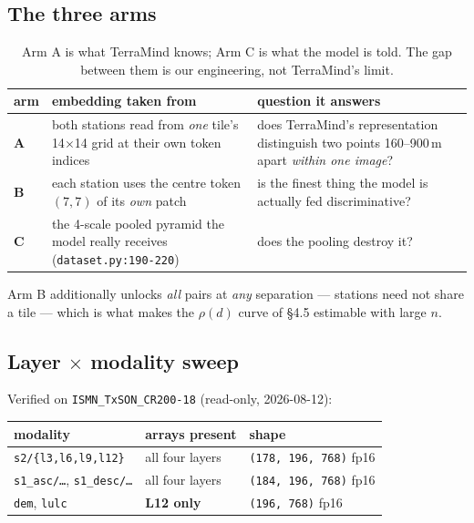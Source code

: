\documentclass[11pt,a4paper]{article}
\begin{document}
\subsection{The three arms}

\begin{table}[h]
\centering\small
\begin{tabular}{@{}p{12mm}p{58mm}p{72mm}@{}}
\toprule
arm & embedding taken from & question it answers \\
\midrule
\textbf{A} & both stations read from \emph{one} tile's 14$\times$14 grid at their own token
             indices
           & does TerraMind's representation distinguish two points 160--900\,m apart
             \emph{within one image}? \\[1mm]
\textbf{B} & each station uses the centre token $(7,7)$ of its \emph{own} patch
           & is the finest thing the model is actually fed discriminative? \\[1mm]
\textbf{C} & the 4-scale pooled pyramid the model really receives
             (\texttt{dataset.py:190-220})
           & does the pooling destroy it? \\
\bottomrule
\end{tabular}
\caption{Arm A is what TerraMind knows; Arm C is what the model is told. The gap between
them is our engineering, not TerraMind's limit.}
\end{table}

Arm B additionally unlocks \emph{all} pairs at \emph{any} separation --- stations need not
share a tile --- which is what makes the $\rho(d)$ curve of \S4.5 estimable with large $n$.

\subsection{Layer $\times$ modality sweep}

Verified on \verb|ISMN_TxSON_CR200-18| (read-only, 2026-08-12):

\begin{table}[h]
\centering\small
\begin{tabular}{@{}lll@{}}
\toprule
modality & arrays present & shape \\
\midrule
\verb|s2/{l3,l6,l9,l12}|                    & all four layers & \verb|(178, 196, 768)| fp16 \\
\verb|s1_asc/…|, \verb|s1_desc/…|           & all four layers & \verb|(184, 196, 768)| fp16 \\
\verb|dem|, \verb|lulc|                     & \textbf{L12 only} & \verb|(196, 768)| fp16 \\
\bottomrule
\end{tabular}
\end{table}
\end{document}
